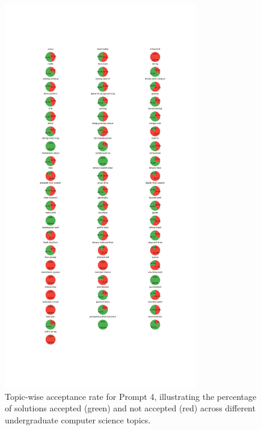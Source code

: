 \begin{figure}[H]
    \centering
    \includegraphics[width=0.75\textwidth, height=0.7\textheight]{figures/4/accepted_not_topicwise.jpg}
    \caption{Topic-wise acceptance rate for Prompt 4, illustrating the percentage of solutions accepted (green) and not accepted (red) across different undergraduate computer science topics.}
    \label{fig:topic_wise_acceptance_prompt_4}
\end{figure}

